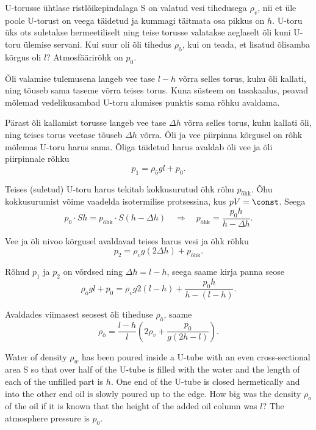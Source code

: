 
U-torusse ühtlase ristlõikepindalaga S on valatud vesi tihedusega $\rho_v$, nii et üle poole U-torust on veega täidetud ja kummagi täitmata osa pikkus on $h$. U-toru üks ots suletakse hermeetiliselt ning teise torusse valatakse aeglaselt õli kuni U-toru ülemise servani. Kui suur oli õli tihedus $\rho_{\text{õ}}$, kui on teada, et lisatud õlisamba kõrgus oli $l$? Atmosfäärirõhk on $p_0$.

\hint
Õli valamise tulemusena langeb vee tase $l - h$ võrra selles torus, kuhu õli kallati, ning tõuseb sama taseme võrra teises torus. Kuna süsteem on tasakaalus, peavad mõlemad vedelikusambad U-toru alumises punktis sama rõhku avaldama.

\solu
Pärast õli kallamist torusse langeb vee tase $\Delta h$ võrra selles torus, kuhu kallati õli, ning teises torus veetase tõuseb $\Delta h$ võrra. Õli ja vee piirpinna kõrgusel on rõhk mõlemas U-toru harus sama. Õliga täidetud harus avaldab õli vee ja õli piirpinnale rõhku
\[ p_1 = \rho_{\text{õ}}gl + p_0.\]

Teises (suletud) U-toru harus tekitab kokkusurutud õhk rõhu $p_{\text{õhk}}$. Õhu kokkusurumist võime vaadelda isotermilise protsessina, kus $pV = \const$. Seega
\[ p_0\cdot Sh = p_{\text{õhk}}\cdot S(h-\Delta h) \quad\Rightarrow\quad p_{\text{õhk}} = \frac{p_0h}{h-\Delta h}.\]

Vee ja õli nivoo kõrgusel avaldavad teises harus vesi ja õhk rõhku
\[ p_2 = \rho_vg(2\Delta h) + p_{\text{õhk}}.\]

Rõhud $p_1$ ja $p_2$ on võrdsed ning $\Delta h = l - h$, seega saame kirja panna seose
\[ \rho_{\text{õ}}gl + p_0 = \rho_vg2(l-h) + \frac{p_0h}{h-(l-h)}.\]

Avaldades viimasest seosest õli tiheduse $\rho_{\text{õ}}$, saame
\[ \rho_{\text{õ}} = \frac{l-h}{l}\left(2\rho_v+\frac{p_0}{g(2h-l)}\right).\]

Water of density $\rho_w$ has been poured inside a U-tube with an even cross-sectional area S so that over half of the U-tube is filled with the water and the length of each of the unfilled part is $h$. One end of the U-tube is closed hermetically and into the other end oil is slowly poured up to the edge. How big was the density $\rho_{o}$ of the oil if it is known that the height of the added oil column was $l$? The atmosphere pressure is $p_0$.

